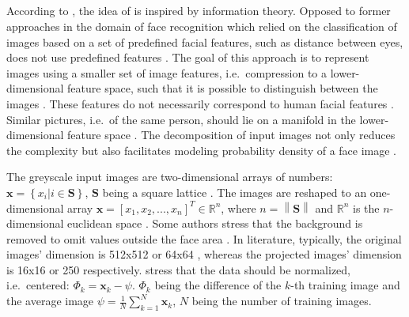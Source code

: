 \subsection{\eigenfaces{}}\label{subsec:eigenface}

According to \citeauthor{eigenfaces1991}, the idea of \eigenfaces{} is inspired by information theory.
Opposed to former approaches in the domain of face recognition which relied on the classification of images based on a set of predefined facial features, 
such as distance between eyes,
\eigenfaces{} does not use predefined features \cite{eigenfaces1991}.
The goal of this approach is to represent images using a smaller set of image features, i.e.\ compression to a lower-dimensional feature space, 
such that it is possible to distinguish between the images \cite{eigenfaces1991, eigenfaces2013}.
These features do not necessarily correspond to human facial features \cite{eigenfaces1991}.
Similar pictures, i.e.\ of the same person, should lie on a manifold in the lower-dimensional feature space \cite{face-recognition2008}.
The decomposition of input images not only reduces the complexity but also facilitates modeling probability density of a face image \cite{face-recognition2008}.

The greyscale input images are two-dimensional arrays of numbers: $\textbf{x} = \left\{ x_i \vert i \in \textbf{S} \right\}$, $\textbf{S}$ being a square lattice \cite{eigenfaces1997, eigenfaces1991}.
The images are reshaped to an one-dimensional array $\textbf{x} = \left[x_1, x_2, ..., x_n  \right]^{T} \in \mathbb{R}^{n}$, 
where $n = \left\| \textbf{S} \right\|$ and $\mathbb{R}^{n}$ is the $n$-dimensional euclidean space \cite{eigenfaces1997}.
Some authors stress that the background is removed to omit values outside the face area \cite{eigenfaces1991}.
In literature, typically, the original images' dimension is 512x512 \cite{eigenfaces1991} or 64x64 \cite{face-recognition2020}, 
whereas the projected images' dimension is 16x16 \cite{eigenfaces1991} or 250 \cite{face-recognition2020} respectively.
\citeauthor{eigenfaces1991} stress that the data should be normalized, i.e.\ centered: 
$\Phi_{k} = \mathbf{x}_{k} - {\psi }$. 
$\Phi_{k}$ being the difference of the $k$-th training image and the average image $\psi = \frac{1}{N}\sum_{k=1}^{N}\textbf{x}_{k}$, $N$ being the number of training images.

